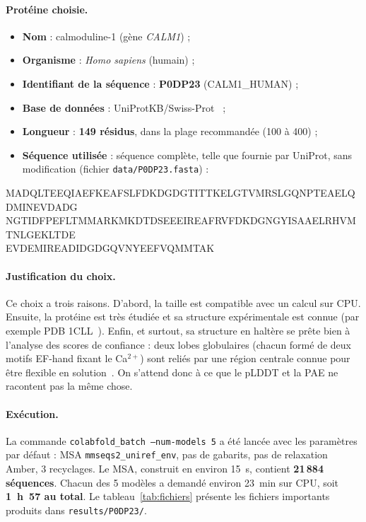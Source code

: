 \paragraph{Protéine choisie.}
\begin{itemize}
  \item \textbf{Nom} : calmoduline-1 (gène \emph{CALM1}) ;
  \item \textbf{Organisme} : \emph{Homo sapiens} (humain) ;
  \item \textbf{Identifiant de la séquence} : \textbf{P0DP23} (CALM1\_HUMAN) ;
  \item \textbf{Base de données} : UniProtKB/Swiss-Prot~\cite{uniprot_P0DP23,uniprot2023} ;
  \item \textbf{Longueur} : \textbf{149 résidus}, dans la plage recommandée (100 à 400) ;
  \item \textbf{Séquence utilisée} : séquence complète, telle que fournie par UniProt, sans modification (fichier \texttt{data/P0DP23.fasta}) :
\end{itemize}

\begin{center}
\scriptsize\ttfamily
MADQLTEEQIAEFKEAFSLFDKDGDGTITTKELGTVMRSLGQNPTEAELQDMINEVDADG\\
NGTIDFPEFLTMMARKMKDTDSEEEIREAFRVFDKDGNGYISAAELRHVMTNLGEKLTDE\\
EVDEMIREADIDGDGQVNYEEFVQMMTAK
\end{center}

\paragraph{Justification du choix.} Ce choix a trois raisons. D'abord, la taille est compatible avec un calcul sur CPU. Ensuite, la protéine est très étudiée et sa structure expérimentale est connue (par exemple PDB 1CLL~\cite{chattopadhyaya1992}). Enfin, et surtout, sa structure en \og haltère \fg{} se prête bien à l'analyse des scores de confiance : deux lobes globulaires (chacun formé de deux motifs EF-hand fixant le Ca$^{2+}$) sont reliés par une région centrale connue pour être flexible en solution~\cite{barbato1992}. On s'attend donc à ce que le pLDDT et la PAE ne racontent pas la même chose.

\paragraph{Exécution.} La commande \texttt{colabfold\_batch --num-models 5} a été lancée avec les paramètres par défaut : MSA \texttt{mmseqs2\_uniref\_env}, pas de gabarits, pas de relaxation Amber, 3 recyclages. Le MSA, construit en environ 15~s, contient \textbf{21\,884 séquences}. Chacun des 5 modèles a demandé environ 23~min sur CPU, soit \textbf{1~h~57 au total}. Le tableau~\ref{tab:fichiers} présente les fichiers importants produits dans \texttt{results/P0DP23/}.

